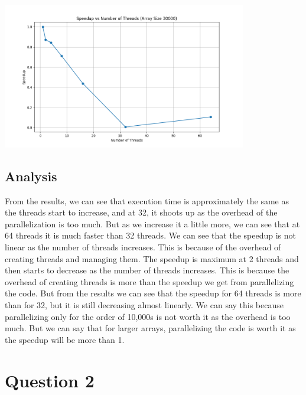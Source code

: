 \documentclass[12pt]{article}
\begin{document}
\begin{center}
    \includegraphics[width=0.8\textwidth]{speedup_vs_threads_30000.png}
    \label{fig:30000}
\end{center}

\subsection*{Analysis}
From the results, we can see that execution time is approximately the same as the threads start to increase, and at 32, it shoots up as the overhead of the parallelization is too much. But as we increase it a little more, we can see that at 64 threads it is much faster than 32 threads. We can see that the speedup is not linear as the number of threads increases. This is because of the overhead of creating threads and managing them. The speedup is maximum at 2 threads and then starts to decrease as the number of threads increases. This is because the overhead of creating threads is more than the speedup we get from parallelizing the code. But from the results we can see that the speedup for 64 threads is more than for 32, but it is still decreasing almost linearly. We can say this because parallelizing only for the order of 10,000s is not worth it as the overhead is too much. But we can say that for larger arrays, parallelizing the code is worth it as the speedup will be more than 1.

\section*{Question 2}
\end{document}
